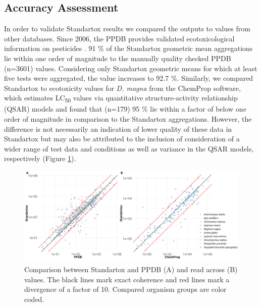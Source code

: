 \subsection{Accuracy Assessment}
In order to validate Standartox results we compared the outputs to values from other databases. Since 2006, the PPDB provides validated ecotoxicological information on pesticides \citep{lewis_international_2016}. 91 \% of the Standartox geometric mean aggregations lie within one order of magnitude to the manually quality checked PPDB (n=3601) values. Considering only Standartox geometric means for which at least five tests were aggregated, the value increases to 92.7 \%. Similarly, we compared Standartox to ecotoxicity values for \textit{D. magna} from the ChemProp \citep{ufzdepartmentofecologicalchemistry_chemprop_2019} software, which estimates LC\textsubscript{50} values via quantitative structure-activity relationship (QSAR) models \citep{schuurmann_quantitative_2011} and found that (n=179) 95 \% lie within a factor of below one order of magnitude in comparison to the Standartox aggregations. However, the difference is not necessarily an indication of lower quality of these data in Standartox but may also be attributed to the inclusion of consideration of a wider range of test data and conditions as well as variance in the QSAR models, respectively (Figure \ref{fig:standartox_ppdb_diff}).

\begin{figure}[h!]
    \includegraphics[width=1\linewidth]{article/figures/gg_ppdb_stan_compare_continous.png}
    \caption{Comparison between Standartox and PPDB (A) and read across (B) values. The black lines mark exact coherence and red lines mark a divergence of a factor of 10. Compared organism groups are color coded.}
    \label{fig:standartox_ppdb_diff}
\end{figure}

